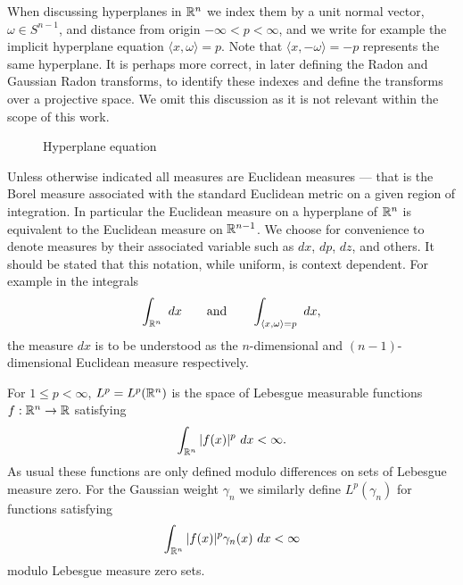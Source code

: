 When discussing hyperplanes in $\mathbb{R}^n$ we index them by a unit normal vector, $\omega \in S^{n-1}$, and distance from origin $-\infty < p < \infty$, and we write for example the implicit hyperplane equation $\langle x, \omega \rangle = p$. Note that $\langle x, -\omega \rangle = -p$ represents the same hyperplane. It is perhaps more correct, in later defining the Radon and Gaussian Radon transforms, to identify these indexes and define the transforms over a projective space. We omit this discussion as it is not relevant within the scope of this work.
\begin{figure}[h]
  \centering
  \caption{Hyperplane equation}\label{fig:HypEq}
\end{figure}

Unless otherwise indicated all measures are Euclidean measures — that is the Borel measure associated with the standard Euclidean metric on a given region of integration. In particular the Euclidean measure on a hyperplane of $\mathbb{R}^n$ is equivalent to the Euclidean measure on $\mathbb{R}^{n-1}$. We choose for convenience to denote measures by their associated variable such as $dx$, $dp$, $dz$, and others. It should be stated that this notation, while uniform, is context dependent. For example in the integrals
\[
  \int_{\mathbb{R}^n}~dx \qquad \text{and} \qquad \int_{\langle x, \omega\rangle = p} ~dx,
\]
the measure $dx$ is to be understood as the $n$-dimensional and $(n-1)$-dimensional Euclidean measure respectively.


  For $1 \leq p < \infty$, $L^p = L^p(\mathbb{R}^n)$ is the space of Lebesgue measurable functions $f : \mathbb{R}^n \to \mathbb{R}$ satisfying
  \[
    \int_{\mathbb{R}^n} |f(x)|^p ~dx < \infty.
  \]
  As usual these functions are only defined modulo differences on sets of Lebesgue measure zero. For the Gaussian weight $\gamma_n$ we similarly define $L^p(\gamma_n)$ for functions satisfying
  \[
    \int_{\mathbb{R}^n} |f(x)|^p \gamma_n(x) ~dx < \infty
  \]
  modulo Lebesgue measure zero sets.

